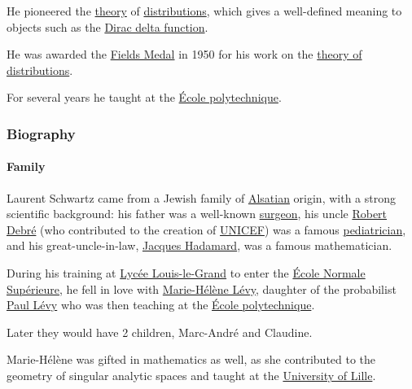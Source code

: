 \documentclass{article}
\begin{document}
He pioneered the \href{https://en.wikipedia.org/wiki/Theory}{theory} of \href{https://en.wikipedia.org/wiki/Distribution_(mathematics)}{distributions}, which gives a well-defined meaning to objects such as the \href{https://en.wikipedia.org/wiki/Dirac_delta_function}{Dirac delta function}.

He was awarded the \href{https://en.wikipedia.org/wiki/Fields_Medal}{Fields Medal} in 1950 for his work on the \href{https://en.wikipedia.org/wiki/Distribution_(mathematics)}{theory of distributions}.

For several years he taught at the \href{https://en.wikipedia.org/wiki/%C3%89cole_polytechnique}{École polytechnique}.

\subsubsection{Biography}

\paragraph{Family}
Laurent Schwartz came from a Jewish family of \href{https://en.wikipedia.org/wiki/Alsace}{Alsatian} origin, with a strong scientific background: his father was a well-known \href{https://en.wikipedia.org/wiki/Surgeon}{surgeon}, his uncle \href{https://en.wikipedia.org/wiki/Robert_Debr%C3%A9}{Robert Debré} (who contributed to the creation of \href{https://en.wikipedia.org/wiki/UNICEF}{UNICEF}) was a famous \href{https://en.wikipedia.org/wiki/Pediatrics}{pediatrician}, and his great-uncle-in-law, \href{https://en.wikipedia.org/wiki/Jacques_Hadamard}{Jacques Hadamard}, was a famous mathematician.

%
During his training at \href{https://en.wikipedia.org/wiki/Lyc%C3%A9e_Louis-le-Grand}{Lycée Louis-le-Grand} to enter the \href{https://en.wikipedia.org/wiki/%C3%89cole_Normale_Sup%C3%A9rieure}{École Normale Supérieure}, he fell in love with \href{https://en.wikipedia.org/wiki/Marie-H%C3%A9l%C3%A8ne_Schwartz}{Marie-Hélène Lévy}, daughter of the probabilist \href{https://en.wikipedia.org/wiki/Paul_L%C3%A9vy_(mathematician)}{Paul Lévy} who was then teaching at the \href{https://en.wikipedia.org/wiki/%C3%89cole_polytechnique}{École polytechnique}.

Later they would have 2 children, Marc-André and Claudine.

Marie-Hélène was gifted in mathematics as well, as she contributed to the geometry of singular analytic spaces and taught at the \href{https://en.wikipedia.org/wiki/Universit%C3%A9_Lille_Nord_de_France}{University of Lille}.
\end{document}
